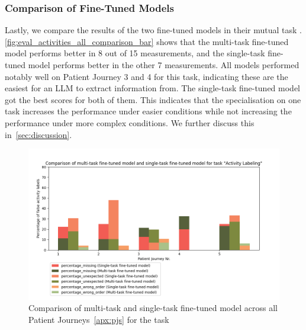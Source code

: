 \subsubsection{Comparison of Fine-Tuned Models}
Lastly, we compare the results of the two fine-tuned models in their mutual task . \autoref{fig:eval_activities_all_comparison_bar} shows that the multi-task fine-tuned model performs better in 8 out of 15 measurements, and the single-task fine-tuned model performs better in the other 7 measurements. All models performed notably well on Patient Journey 3 and 4 for this task, indicating these are the easiest for an LLM to extract information from. The single-task fine-tuned model got the best scores for both of them. This indicates that the specialisation on one task increases the performance under easier conditions while not increasing the performance under more complex conditions. We further discuss this in~\autoref{sec:discussion}.

\begin{figure}[th]
    \centering
    \captionsetup{belowskip=0pt,aboveskip=0pt}
    \includegraphics[width=\textwidth]{bachelor_thesis/images/activites_all-single_vs_multi.png}
    \caption{Comparison of multi-task and single-task fine-tuned model across all Patient Journeys~\ref{apx:pjs} for the task } 
    \label{fig:eval_activities_all_comparison_bar}
\end{figure}
